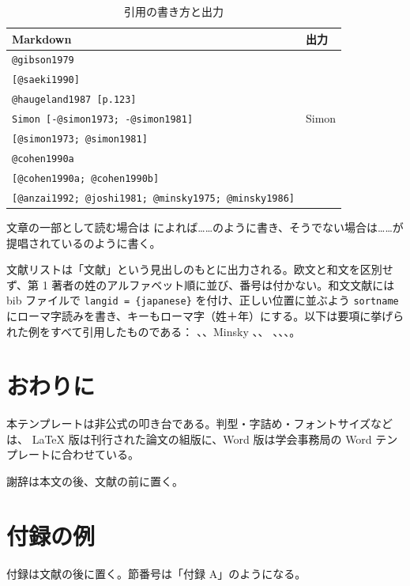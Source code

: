 \documentclass[paper]{bunkajoho}
\begin{document}
\begin{table}[tb]
  \centering
  \caption{引用の書き方と出力}
  \footnotesize
  \begin{tabular}{ll}
    \toprule
    Markdown & 出力 \\
    \midrule
    \texttt{@gibson1979} & \textcite{gibson1979} \\
    \texttt{{[}@saeki1990{]}} & \autocite{saeki1990} \\
    \texttt{@haugeland1987\ {[}p.123{]}} & \textcite[123]{haugeland1987} \\
    \texttt{Simon\ {[}-@simon1973;\ -@simon1981{]}} & Simon \autocite*{simon1973,simon1981} \\
    \texttt{{[}@simon1973;\ @simon1981{]}} & \autocite{simon1973,simon1981} \\
    \texttt{@cohen1990a} & \textcite{cohen1990a} \\
    \texttt{{[}@cohen1990a;\ @cohen1990b{]}} & \autocite{cohen1990a,cohen1990b} \\
    \texttt{{[}@anzai1992;\ @joshi1981;\ @minsky1975;\ @minsky1986{]}} & \autocite{anzai1992,joshi1981,minsky1975,minsky1986} \\
    \bottomrule
  \end{tabular}
\end{table}

文章の一部として読む場合は \textcite{gibson1979} によれば\ldots\ldots のように書き、そうでない場合は\ldots\ldots が提唱されている\autocite{saeki1990}のように書く。

文献リストは「文献」という見出しのもとに出力される。欧文と和文を区別せず、第 1 著者の姓のアルファベット順に並び、番号は付かない。和文文献には bib ファイルで \texttt{langid\ =\ \{japanese\}} を付け、正しい位置に並ぶよう \texttt{sortname} にローマ字読みを書き、キーもローマ字（姓＋年）にする。以下は要項に挙げられた例をすべて引用したものである：
\textcite{miller1956}、\textcite{cohen1985}、Minsky \autocite*{minsky1986,minsky1986b}、\textcite{saeki1990}、
\textcite{minsky1975}、\textcite{perrault1990b}、\textcite{rosenschein1987}、\textcite{devins1981}。

\section{おわりに}

本テンプレートは非公式の叩き台である。判型・字詰め・フォントサイズなどは、
LaTeX 版は刊行された論文の組版に、Word 版は学会事務局の Word テンプレートに合わせている。


謝辞は本文の後、文献の前に置く。

\printbibliography

\appendix

\section{付録の例}

付録は文献の後に置く。節番号は「付録 A」のようになる。
\end{document}
